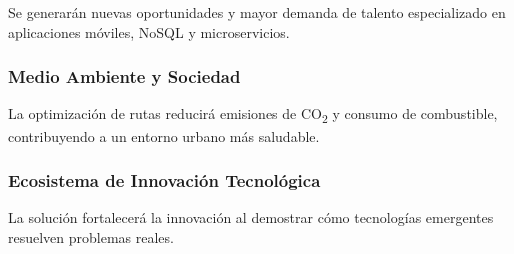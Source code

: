 Se generarán nuevas oportunidades y mayor demanda de talento especializado en aplicaciones móviles, NoSQL y microservicios.

\subsubsection{Medio Ambiente y Sociedad}

La optimización de rutas reducirá emisiones de CO\textsubscript{2} y consumo de combustible, contribuyendo a un entorno urbano más saludable.

\subsubsection{Ecosistema de Innovación Tecnológica}

La solución fortalecerá la innovación al demostrar cómo tecnologías emergentes resuelven problemas reales.
